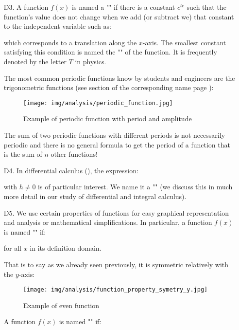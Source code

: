 \begin{enumerate}
		\item[D3.] A function $f(x)$ is named a "" if there is a constant $c^{te}$ such that the function's value does not change when we add (or subtract we) that constant to the independent variable such as:
		
		which corresponds to a translation along the $x$-axis. The smallest constant satisfying this condition is named the "" of the function. It is frequently denoted by the letter $T$ in physics.
		
		The most common periodic functions know by students and engineers are the trigonometric functions (see section of the corresponding name page \pageref{trigonometry}):
		\begin{figure}[H]
			\centering
			\texttt{[image: img/analysis/periodic\_function.jpg]}
			\caption{Example of periodic function with period and amplitude}
		\end{figure}
		 \begin{tcolorbox}[title=Remark,colframe=black,arc=10pt]
		The sum of two periodic functions with different periods is not necessarily periodic and there is no general formula to get the period of a function that is the sum of $n$ other functions!
		\end{tcolorbox}
		
		\item[D4.] In differential calculus (), the expression:
		
		with $h\neq 0$ is of particular interest. We name it a "" (we discuss this in much more detail in our study of differential and integral calculus).
		
		\item[D5.] We use certain properties of functions for easy graphical representation and analysis or mathematical simplifications. In particular, a function $f (x)$ is named "\label{even function}" if:
		
		for all $x$ in its definition domain.
		
		That is to say as we already seen previously, it is symmetric relatively with the $y$-axis:
		\begin{figure}[H]
			\centering
			\texttt{[image: img/analysis/function\_property\_symetry\_y.jpg]}
			\caption{Example of even function}
		\end{figure}
		A function $f (x)$ is named "\label{odd function}" if:
		

\end{enumerate}
